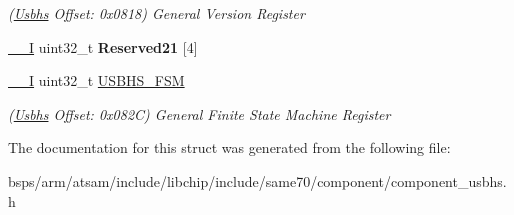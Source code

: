 \begin{DoxyCompactItemize}
\begin{DoxyCompactList}\small\item\em (\mbox{\hyperlink{structUsbhs}{Usbhs}} Offset\+: 0x0818) General Version Register \end{DoxyCompactList}\item 
\mbox{\label{structUsbhs_a366566a1739ed109998ead474a7e869d}} 
\mbox{\hyperlink{core__cm7_8h_af63697ed9952cc71e1225efe205f6cd3}{\+\_\+\+\_\+I}} uint32\+\_\+t {\bfseries Reserved21} \mbox{[}4\mbox{]}
\item 
\mbox{\label{structUsbhs_a9adf0cb73a2ec79bda32804e395d72da}} 
\mbox{\hyperlink{core__cm7_8h_af63697ed9952cc71e1225efe205f6cd3}{\+\_\+\+\_\+I}} uint32\+\_\+t \mbox{\hyperlink{structUsbhs_a9adf0cb73a2ec79bda32804e395d72da}{U\+S\+B\+H\+S\+\_\+\+F\+SM}}
\begin{DoxyCompactList}\small\item\em (\mbox{\hyperlink{structUsbhs}{Usbhs}} Offset\+: 0x082C) General Finite State Machine Register \end{DoxyCompactList}\end{DoxyCompactItemize}


The documentation for this struct was generated from the following file\+:\begin{DoxyCompactItemize}
\item 
bsps/arm/atsam/include/libchip/include/same70/component/component\+\_\+usbhs.\+h\end{DoxyCompactItemize}
